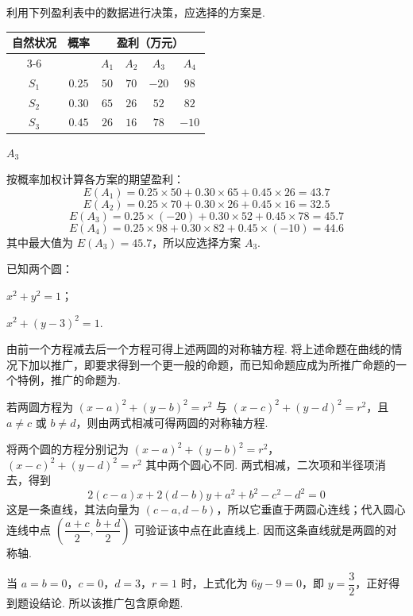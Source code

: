 \begin{problem}
利用下列盈利表中的数据进行决策，应选择的方案是\fillinblank{}.

\begin{center}
\begin{tabular}{|c|c|c|c|c|c|}
\hline
自然状况 & 概率 & \multicolumn{4}{c|}{盈利（万元）} \\
\cline{3-6}
 & & \(A_1\) & \(A_2\) & \(A_3\) & \(A_4\) \\
\hline
\(S_1\) & \(0.25\) & \(50\) & \(70\) & \(-20\) & \(98\) \\
\hline
\(S_2\) & \(0.30\) & \(65\) & \(26\) & \(52\) & \(82\) \\
\hline
\(S_3\) & \(0.45\) & \(26\) & \(16\) & \(78\) & \(-10\) \\
\hline
\end{tabular}
\end{center}
\end{problem}

\begin{answer}
\(A_3\)
\end{answer}

\begin{solution}
按概率加权计算各方案的期望盈利：
\[
E(A_1)=0.25\times50+0.30\times65+0.45\times26=43.7
\]
\[
E(A_2)=0.25\times70+0.30\times26+0.45\times16=32.5
\]
\[
E(A_3)=0.25\times(-20)+0.30\times52+0.45\times78=45.7
\]
\[
E(A_4)=0.25\times98+0.30\times82+0.45\times(-10)=44.6
\]
其中最大值为 \(E(A_3)=45.7\)，所以应选择方案 \(A_3\).
\end{solution}

\begin{problem}
已知两个圆：
\begin{circlelist}
\item \(x^2+y^2=1\)；
\item \(x^2+(y-3)^2=1\).
\end{circlelist}
由前一个方程减去后一个方程可得上述两圆的对称轴方程. 将上述命题在曲线的情况下加以推广，即要求得到一个更一般的命题，而已知命题应成为所推广命题的一个特例，推广的命题为\fillinblank{}.
\end{problem}

\begin{answer}
若两圆方程为 \((x-a)^2+(y-b)^2=r^2\) 与 \((x-c)^2+(y-d)^2=r^2\)，且 \(a\ne c\) 或 \(b\ne d\)，则由两式相减可得两圆的对称轴方程.
\end{answer}

\begin{solution}
将两个圆的方程分别记为
\((x-a)^2+(y-b)^2=r^2\)，\((x-c)^2+(y-d)^2=r^2\)
其中两个圆心不同. 两式相减，二次项和半径项消去，得到
\[
2(c-a)x+2(d-b)y+a^2+b^2-c^2-d^2=0
\]
这是一条直线，其法向量为 \((c-a,d-b)\)，所以它垂直于两圆心连线；代入圆心连线中点 \(\left(\dfrac{a+c}{2},\dfrac{b+d}{2}\right)\) 可验证该中点在此直线上. 因而这条直线就是两圆的对称轴.

当 \(a=b=0\)，\(c=0\)，\(d=3\)，\(r=1\) 时，上式化为 \(6y-9=0\)，即 \(y=\dfrac32\)，正好得到题设结论. 所以该推广包含原命题.
\end{solution}

